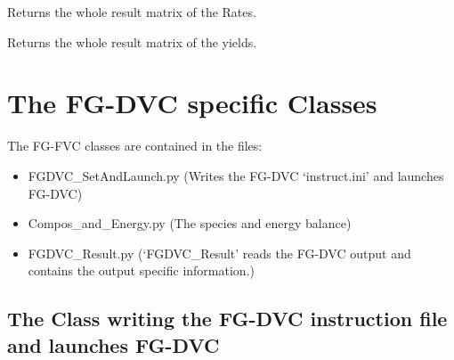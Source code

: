 \documentclass[letterpaper,10pt,english]{sphinxmanual}
\begin{document}
\begin{fulllineitems}
\begin{fulllineitems}
\label{CPDClasses:CPD_Result.CPD_Result.Rates_all}
Returns the whole result matrix of the Rates.

\end{fulllineitems}


\begin{fulllineitems}
\label{CPDClasses:CPD_Result.CPD_Result.Yields_all}
Returns the whole result matrix of the yields.

\end{fulllineitems}


\end{fulllineitems}



\chapter{The FG-DVC specific Classes}
\label{FGDVCClasses::doc}\label{FGDVCClasses:the-fg-dvc-specific-classes}
The FG-FVC classes are contained in the files:
\begin{itemize}
\item {} 
FGDVC\_SetAndLaunch.py  (Writes the FG-DVC `instruct.ini' and launches FG-DVC)

\item {} 
Compos\_and\_Energy.py  (The species and energy balance)

\item {} 
FGDVC\_Result.py  (`FGDVC\_Result' reads the FG-DVC output and contains the output specific information.)

\end{itemize}
\label{FGDVCClasses:ss-readgen}

\section{The Class writing the FG-DVC instruction file and launches FG-DVC}
\label{FGDVCClasses:ss-readgen}\label{FGDVCClasses:the-class-writing-the-fg-dvc-instruction-file-and-launches-fg-dvc}\label{FGDVCClasses:my-reference-label}
\end{document}
